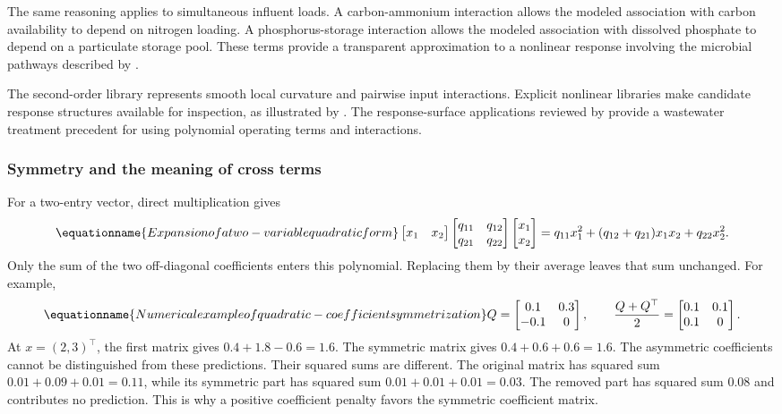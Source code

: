 The same reasoning applies to simultaneous influent loads. A carbon-ammonium interaction allows the modeled association with carbon availability to depend on nitrogen loading. A phosphorus-storage interaction allows the modeled association with dissolved phosphate to depend on a particulate storage pool. These terms provide a transparent approximation to a nonlinear response involving the microbial pathways described by \citet{Henze1999}.

The second-order library represents smooth local curvature and pairwise input interactions. Explicit nonlinear libraries make candidate response structures available for inspection, as illustrated by \citet{Brunton2016}. The response-surface applications reviewed by \citet{Nazlabadi2021} provide a wastewater treatment precedent for using polynomial operating terms and interactions.

\subsubsection{Symmetry and the meaning of cross terms}

For a two-entry vector, direct multiplication gives
\begin{equation}
\equationname{Expansion of a two-variable quadratic form}
\label{eq:icsor_scalar_quadratic}
\begin{bmatrix}x_1&x_2\end{bmatrix}
\begin{bmatrix}q_{11}&q_{12}\\q_{21}&q_{22}\end{bmatrix}
\begin{bmatrix}x_1\\x_2\end{bmatrix}
=q_{11}x_1^2+(q_{12}+q_{21})x_1x_2+q_{22}x_2^2.
\end{equation}
Only the sum of the two off-diagonal coefficients enters this polynomial. Replacing them by their average leaves that sum unchanged. For example,
\begin{equation}
\equationname{Numerical example of quadratic-coefficient symmetrization}
\label{eq:icsor_symmetry_numbers}
Q=\begin{bmatrix}0.1&0.3\\-0.1&0\end{bmatrix},
\qquad
\frac{Q+Q^\top}{2}=\begin{bmatrix}0.1&0.1\\0.1&0\end{bmatrix}.
\end{equation}
At \(x=(2,3)^\top\), the first matrix gives \(0.4+1.8-0.6=1.6\). The symmetric matrix gives \(0.4+0.6+0.6=1.6\). The asymmetric coefficients cannot be distinguished from these predictions. Their squared sums are different. The original matrix has squared sum \(0.01+0.09+0.01=0.11\), while its symmetric part has squared sum \(0.01+0.01+0.01=0.03\). The removed part has squared sum 0.08 and contributes no prediction. This is why a positive coefficient penalty favors the symmetric coefficient matrix.

